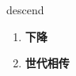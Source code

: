
\begin{frame}
{\huge descend}
\begin{center}
\begin{enumerate}\Large
  \item \textbf{下降}
  \item \textbf{世代相传}
\end{enumerate}
\end{center}
\end{frame}
